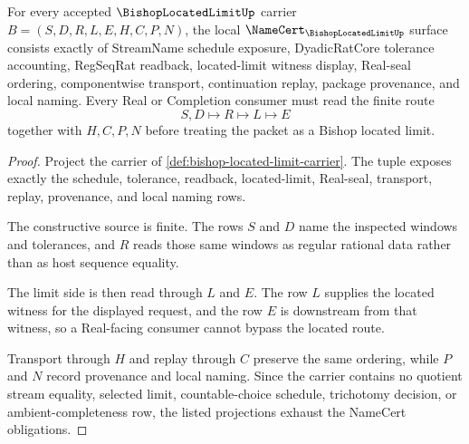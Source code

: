 \begin{theorem}
\label{thm:bishop-located-limit-namecert-obligations}
For every accepted $\BishopLocatedLimitUp$ carrier $B=(S,D,R,L,E,H,C,P,N)$, the local $\NameCert_{\BishopLocatedLimitUp}$ surface consists exactly of StreamName schedule exposure, DyadicRatCore tolerance accounting, RegSeqRat readback, located-limit witness display, Real-seal ordering, componentwise transport, continuation replay, package provenance, and local naming. Every Real or Completion consumer must read the finite route
$$
S,D \longmapsto R \longmapsto L \longmapsto E
$$
together with $H,C,P,N$ before treating the packet as a Bishop located limit.
\end{theorem}
\begin{proof}
Project the carrier of \autoref{def:bishop-located-limit-carrier}. The tuple exposes exactly the schedule, tolerance, readback, located-limit, Real-seal, transport, replay, provenance, and local naming rows.

The constructive source is finite. The rows $S$ and $D$ name the inspected windows and tolerances, and $R$ reads those same windows as regular rational data rather than as host sequence equality.

The limit side is then read through $L$ and $E$. The row $L$ supplies the located witness for the displayed request, and the row $E$ is downstream from that witness, so a Real-facing consumer cannot bypass the located route.

Transport through $H$ and replay through $C$ preserve the same ordering, while $P$ and $N$ record provenance and local naming. Since the carrier contains no quotient stream equality, selected limit, countable-choice schedule, trichotomy decision, or ambient-completeness row, the listed projections exhaust the NameCert obligations.
\end{proof}

